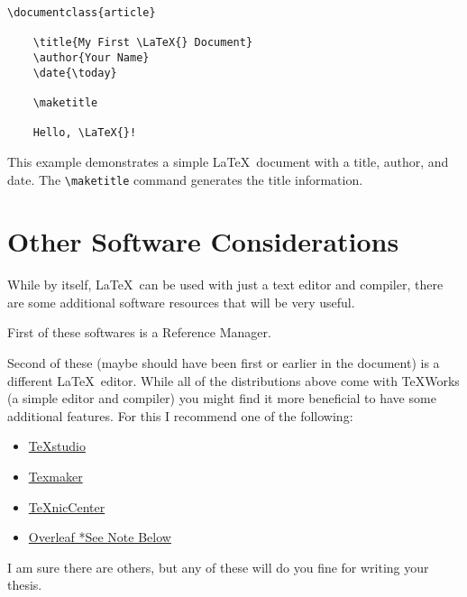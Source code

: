 		\begin{lstlisting}[style=LaTeXStyle]
\documentclass{article}

    \title{My First \LaTeX{} Document}
    \author{Your Name}
    \date{\today}
    
    \maketitle
    
    Hello, \LaTeX{}!

		\end{lstlisting}
		This example demonstrates a simple \LaTeX\ document with a title, author, and date. 
		The \lstinline|\maketitle| command generates the title information.

	\section{Other Software Considerations}
		While by itself, \LaTeX\ can be used with just a text editor and compiler, there are some additional software resources that will be very useful.
		
		First of these softwares is a Reference Manager.
		
		
		Second of these (maybe should have been first or earlier in the document) is a different \LaTeX\ editor.
		While all of the distributions above come with TeXWorks (a simple editor and compiler) you might find it more beneficial to have some additional features.
		For this I recommend one of the following:
		\begin{itemize}
			\item \href{https://www.texstudio.org/}{TeXstudio}
			\item \href{http://www.xm1math.net/texmaker/}{Texmaker}
			\item \href{http://www.texniccenter.org/}{TeXnicCenter}
			\item \href{https://www.overleaf.com/}{Overleaf *See Note Below}
		\end{itemize}
		I am sure there are others, but any of these will do you fine for writing your thesis.
		
